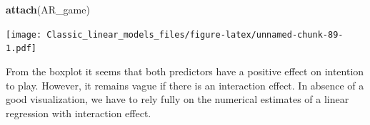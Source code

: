 \documentclass[]{svmono}
\newenvironment{Shaded}{\begin{snugshade}}{\end{snugshade}}
\newcommand{\KeywordTok}[1]{\textcolor[rgb]{0.13,0.29,0.53}{\textbf{#1}}}
\newcommand{\DataTypeTok}[1]{\textcolor[rgb]{0.13,0.29,0.53}{#1}}
\newcommand{\DecValTok}[1]{\textcolor[rgb]{0.00,0.00,0.81}{#1}}
\newcommand{\FloatTok}[1]{\textcolor[rgb]{0.00,0.00,0.81}{#1}}
\newcommand{\StringTok}[1]{\textcolor[rgb]{0.31,0.60,0.02}{#1}}
\newcommand{\OperatorTok}[1]{\textcolor[rgb]{0.81,0.36,0.00}{\textbf{#1}}}
\newcommand{\NormalTok}[1]{#1}
\theoremstyle{definition}
\theoremstyle{definition}
\theoremstyle{definition}
\theoremstyle{remark}
\begin{document}
\begin{Shaded}
\begin{Highlighting}[]
\KeywordTok{attach}\NormalTok{(AR_game)}
\end{Highlighting}
\end{Shaded}

\begin{Shaded}
\end{Shaded}

\texttt{[image: Classic\_linear\_models\_files/figure-latex/unnamed-chunk-89-1.pdf]}

From the boxplot it seems that both predictors have a positive effect on
intention to play. However, it remains vague if there is an interaction
effect. In absence of a good visualization, we have to rely fully on the
numerical estimates of a linear regression with interaction effect.

\begin{Shaded}
\end{Shaded}
\end{document}
